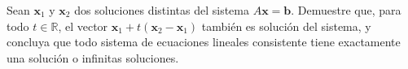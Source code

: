 \begin{prob} Sean $\mathbf{x}_1$ y $\mathbf{x}_2$ dos soluciones distintas del sistema $A\mathbf{x}=\mathbf{b}$. Demuestre que, para todo $t\in\mathbb{R}$, el vector $\mathbf{x}_1+t\left(\mathbf{x}_2-\mathbf{x}_1\right)$ también es solución del sistema, y concluya que todo sistema de ecuaciones lineales consistente tiene exactamente una solución o infinitas soluciones.
\end{prob}
